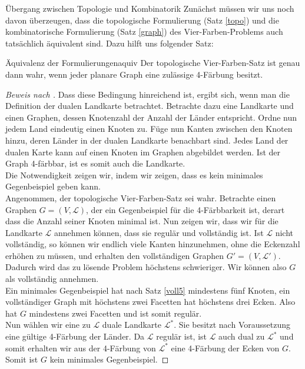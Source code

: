 \begin{chapter}{Übergang zwischen Topologie und Kombinatorik}
 Zunächst müssen wir uns noch davon überzeugen, dass die topologische Formulierung (Satz \ref{topo}) und die kombinatorische Formulierung (Satz \ref{graph}) des Vier-Farben-Problems auch tatsächlich äquivalent sind. Dazu hilft uns folgender Satz:
 
 \begin{satzl}{Äquivalenz der Formulierungen}{aquiv}
  Der topologische Vier-Farben-Satz ist genau dann wahr, wenn jeder planare Graph eine zulässige 4-Färbung besitzt.
 \end{satzl}
 
 \begin{proof}[Beweis nach \cite{fritsch}]
  Dass diese Bedingung hinreichend ist, ergibt sich, wenn man die Definition der dualen Landkarte betrachtet. Betrachte dazu eine Landkarte und einen Graphen, dessen Knotenzahl der Anzahl der Länder entspricht. Ordne nun jedem Land eindeutig einen Knoten zu. Füge nun Kanten zwischen den Knoten hinzu, deren Länder in der dualen Landkarte benachbart sind. Jedes Land der dualen Karte kann auf einen Knoten im Graphen abgebildet werden. Ist der Graph 4-färbbar, ist es somit auch die Landkarte.\\
  Die Notwendigkeit zeigen wir, indem wir zeigen, dass es kein minimales Gegenbeispiel geben kann.\\
  Angenommen, der topologische Vier-Farben-Satz sei wahr. Betrachte einen Graphen $G=(V,\mathcal{L})$, der ein Gegenbeispiel für die 4-Färbbarkeit ist, derart dass die Anzahl seiner Knoten minimal ist. Nun zeigen wir, dass wir für die Landkarte $\mathcal{L}$ annehmen können, dass sie regulär und vollständig ist. Ist $\mathcal{L}$ nicht vollständig, so können wir endlich viele Kanten hinzunehmen, ohne die Eckenzahl erhöhen zu müssen, und erhalten den vollständigen Graphen $G' = (V,\mathcal{L}')$. Dadurch wird das zu lösende Problem höchstens schwieriger. Wir können also $G$ als vollständig annehmen. \\
  Ein minimales Gegenbeispiel hat nach Satz \ref{voll5} mindestens fünf Knoten, ein vollständiger Graph mit höchstens zwei Facetten hat höchstens drei Ecken. Also hat $G$ mindestens zwei Facetten und ist somit regulär.\\
  Nun wählen wir eine zu $\mathcal{L}$ duale Landkarte $\mathcal{L}^*$. Sie besitzt nach Voraussetzung eine gültige 4-Färbung der Länder. Da $\mathcal{L}$ regulär ist, ist $\mathcal{L}$ auch dual zu $\mathcal{L}^*$ und somit erhalten wir aus der 4-Färbung von $\mathcal{L}^*$ eine 4-Färbung der Ecken von $G$. Somit ist $G$ kein minimales Gegenbeispiel.
 \end{proof}

\end{chapter}